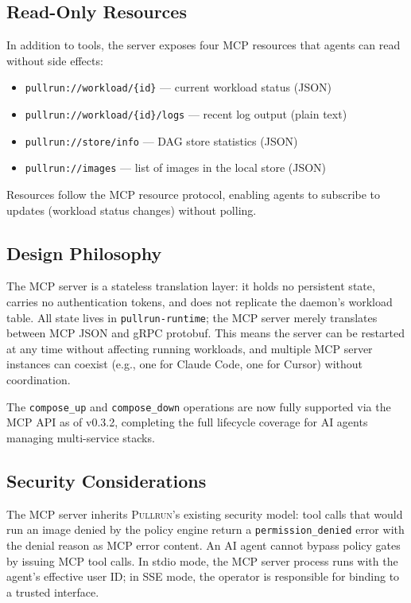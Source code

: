 \documentclass[11pt,a4paper]{article}
\newcommand{\pullrun}{\textsc{Pullrun}}
\begin{document}
\subsection{Read-Only Resources}

In addition to tools, the server exposes four MCP resources that agents can read without side effects:

\begin{itemize}[leftmargin=*]
    \item \texttt{pullrun://workload/\{id\}} --- current workload status (JSON)
    \item \texttt{pullrun://workload/\{id\}/logs} --- recent log output (plain text)
    \item \texttt{pullrun://store/info} --- DAG store statistics (JSON)
    \item \texttt{pullrun://images} --- list of images in the local store (JSON)
\end{itemize}

Resources follow the MCP resource protocol, enabling agents to subscribe to updates (workload status changes) without polling.

\subsection{Design Philosophy}

The MCP server is a stateless translation layer: it holds no persistent state, carries no authentication tokens, and does not replicate the daemon's workload table. All state lives in \texttt{pullrun-runtime}; the MCP server merely translates between MCP JSON and gRPC protobuf. This means the server can be restarted at any time without affecting running workloads, and multiple MCP server instances can coexist (e.g., one for Claude Code, one for Cursor) without coordination.

The \texttt{compose\_up} and \texttt{compose\_down} operations are now fully supported via the MCP API as of v0.3.2, completing the full lifecycle coverage for AI agents managing multi-service stacks.

\subsection{Security Considerations}

The MCP server inherits \pullrun{}'s existing security model: tool calls that would run an image denied by the policy engine return a \texttt{permission\_denied} error with the denial reason as MCP error content. An AI agent cannot bypass policy gates by issuing MCP tool calls. In stdio mode, the MCP server process runs with the agent's effective user ID; in SSE mode, the operator is responsible for binding to a trusted interface.
\end{document}
